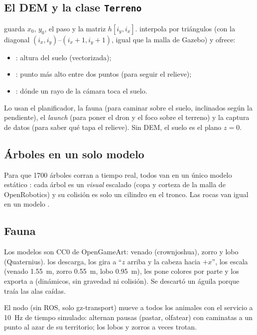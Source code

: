 \subsection{El DEM y la clase \texttt{Terreno}}

 guarda $x_0$, $y_0$, el paso y la matriz $h[i_y, i_x]$. 
interpola por triángulos (con la diagonal $(i_x,i_y)$--$(i_x{+}1,i_y{+}1)$, igual que la malla de
Gazebo) y ofrece:
\begin{itemize}
  \item {}: altura del suelo (vectorizada);
  \item {}: punto más alto entre dos puntos (para seguir el relieve);
  \item {}: dónde un rayo de la cámara toca el suelo.
\end{itemize}
Lo usan el planificador, la fauna (para caminar sobre el suelo, inclinados según la pendiente), el
\emph{launch} (para poner el dron y el foco sobre el terreno) y la captura de datos (para saber
qué tapa el relieve). Sin DEM, el suelo es el plano $z = 0$.

\subsection{Árboles en un solo modelo}

Para que 1700 árboles corran a tiempo real, todos van en un único modelo estático :
cada árbol es un \emph{visual} escalado (copa y corteza de la malla de OpenRobotics) y su
colisión es solo un cilindro en el tronco. Las rocas van igual en un modelo .

\subsection{Fauna}

Los modelos son CC0 de OpenGameArt: venado (crownjoshua), zorro y lobo (Quaternius).
 los descarga, los gira a ``$z$ arriba y la cabeza hacia $+x$'',
los escala (venado 1.55~m, zorro 0.55~m, lobo 0.95~m), les pone colores por parte y los exporta a
 (dinámicos, sin gravedad ni colisión). Se descartó un águila porque traía las
alas caídas.

El nodo  (sin ROS, solo gz-transport) mueve a todos los animales con el servicio
 a 10~Hz de tiempo simulado: alternan pausas (pastar,
olfatear) con caminatas a un punto al azar de su territorio; los lobos y zorros a veces trotan.

